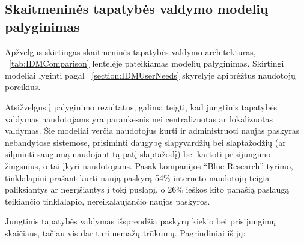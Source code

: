 \subsection{Skaitmeninės tapatybės valdymo modelių palyginimas}

Apžvelgus skirtingas skaitmeninės tapatybės valdymo architektūras, ~\ref{tab:IDMComparison} lentelėje pateikiamas modelių palyginimas.
Skirtingi modeliai lyginti pagal ~\ref{section:IDMUserNeeds} skyrelyje apibrėžtus naudotojų poreikius. 

Atsižvelgus į palyginimo rezultatus, galima teigti, kad jungtinis tapatybės valdymas naudotojams yra parankesnis nei centralizuotas
ar lokalizuotas valdymas. Šie modeliai verčia naudotojus kurti ir administruoti naujas paskyras nebandytose sistemose,
prisiminti daugybę slapyvardžių bei slaptažodžių (ar silpninti saugumą naudojant tą patį slaptažodį) bei kartoti prisijungimo žingsnius,
o tai įkyri naudotojams. Pasak kompanijos \enquote{Blue Research} tyrimo, tinklalapiui prašant kurti naują paskyrą 54\% interneto naudotojų
teigia paliksiantys ar negrįšiantys į tokį puslapį, o 26\% ieškos kito panašią paslaugą teikiančio tinklalapio, nereikalaujančio naujos paskyros. 




Jungtinis tapatybės valdymas išsprendžia paskyrų kiekio bei prisijungimų skaičiaus, tačiau vis dar turi nemažų trūkumų. Pagrindiniai iš jų:

